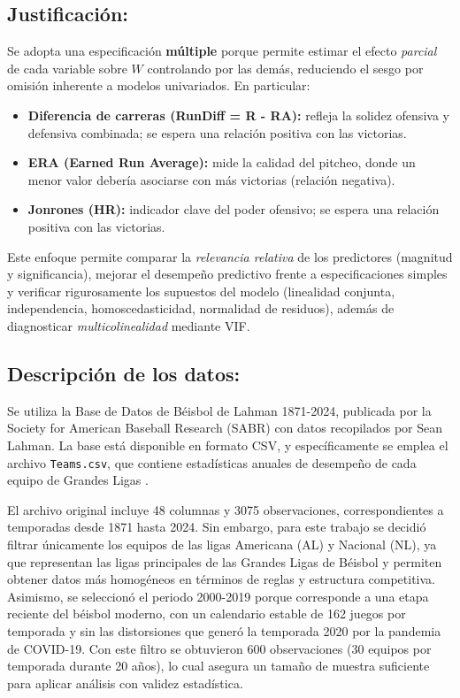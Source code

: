 \documentclass[man,floatsintext]{apa7}
\begin{document}
\subsection{Justificación:}
Se adopta una especificación \textbf{múltiple} porque permite estimar el efecto \emph{parcial} de cada variable sobre $W$ controlando por las demás, reduciendo el sesgo por omisión inherente a modelos univariados. En particular:
\begin{itemize}
    \item \textbf{Diferencia de carreras (RunDiff = R - RA):} refleja la solidez ofensiva y defensiva combinada; se espera una relación positiva con las victorias.
    \item \textbf{ERA (Earned Run Average):} mide la calidad del pitcheo, donde un menor valor debería asociarse con más victorias (relación negativa).
    \item \textbf{Jonrones (HR):} indicador clave del poder ofensivo; se espera una relación positiva con las victorias.
\end{itemize}
Este enfoque permite comparar la \emph{relevancia relativa} de los predictores (magnitud y significancia), mejorar el desempeño predictivo frente a especificaciones simples y verificar rigurosamente los supuestos del modelo (linealidad conjunta, independencia, homoscedasticidad, normalidad de residuos), además de diagnosticar \emph{multicolinealidad} mediante VIF.
%
\subsection{Descripción de los datos:}
Se utiliza la Base de Datos de Béisbol de Lahman 1871-2024, publicada por la Society for American Baseball Research (SABR) con datos recopilados por Sean Lahman. La base está disponible en formato CSV, y específicamente se emplea el archivo \texttt{Teams.csv}, que contiene estadísticas anuales de desempeño de cada equipo de Grandes Ligas . 

El archivo original incluye 48 columnas y 3075 observaciones, correspondientes a temporadas desde 1871 hasta 2024. Sin embargo, para este trabajo se decidió filtrar únicamente los equipos de las ligas Americana (AL) y Nacional (NL), ya que representan las ligas principales de las Grandes Ligas de Béisbol y permiten obtener datos más homogéneos en términos de reglas y estructura competitiva. Asimismo, se seleccionó el periodo 2000-2019 porque corresponde a una etapa reciente del béisbol moderno, con un calendario estable de 162 juegos por temporada y sin las distorsiones que generó la temporada 2020 por la pandemia de COVID-19. Con este filtro se obtuvieron 600 observaciones (30 equipos por temporada durante 20 años), lo cual asegura un tamaño de muestra suficiente para aplicar análisis con validez estadística.
\end{document}
